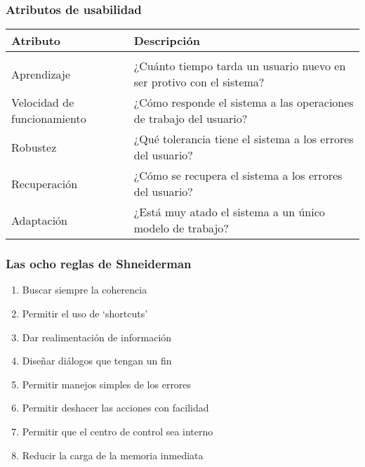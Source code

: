 \subsubsection{Atributos de usabilidad}
\begin{center}
\begin{tabu}{p{7cm}|p{7cm}}
\rowfont{\bfseries\itshape\large} Atributo & Descripción\\
\hline
\\[2pt]

Aprendizaje &
¿Cuánto tiempo tarda un usuario nuevo en ser protivo con el sistema?\\[2pt]
Velocidad de funcionamiento &
¿Cómo responde el sistema a las operaciones de trabajo del usuario?\\[2pt]
Robustez &
¿Qué tolerancia tiene el sistema a los errores del usuario? \\[2pt]
Recuperación &
¿Cómo se recupera el sistema a los errores del usuario?\\[2pt]
Adaptación &
¿Está muy atado el sistema a un único modelo de trabajo?

\end{tabu}
\end{center}

\subsubsection{Las ocho reglas de Shneiderman}
\begin{enumerate}
\item Buscar siempre la coherencia
\item Permitir el uso de `shortcuts'
\item Dar realimentación de información
\item Diseñar diálogos que tengan un fin
\item Permitir manejos simples de los errores
\item Permitir deshacer las acciones con facilidad
\item Permitir que el centro de control sea interno
\item Reducir la carga de la memoria inmediata
\end{enumerate}
